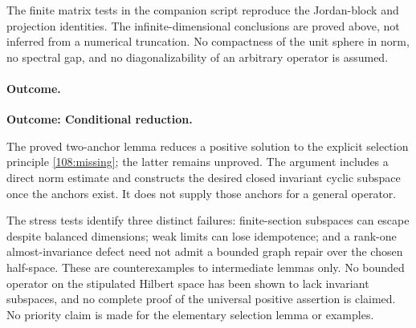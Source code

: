 \documentclass[11pt,a4paper]{article}
\numberwithin{equation}{section}
\begin{document}
The finite matrix tests in the companion script reproduce the Jordan-block
and projection identities. The infinite-dimensional conclusions are proved
above, not inferred from a numerical truncation. No compactness of the unit
sphere in norm, no spectral gap, and no diagonalizability of an arbitrary
operator is assumed.

\paragraph{Outcome.}
\textbf{Outcome: Conditional reduction.}

The proved two-anchor lemma reduces a positive solution to the explicit
selection principle \eqref{108:missing}; the latter remains unproved.
The argument includes a direct norm estimate and constructs the desired
closed invariant cyclic subspace once the anchors exist. It does not
supply those anchors for a general operator.

The stress tests identify three distinct failures: finite-section subspaces
can escape despite balanced dimensions; weak limits can lose idempotence;
and a rank-one almost-invariance defect need not admit a bounded graph
repair over the chosen half-space. These are counterexamples to intermediate
lemmas only. No bounded operator on the stipulated Hilbert space has been
shown to lack invariant subspaces, and no complete proof of the universal
positive assertion is claimed. No priority claim is made for the elementary
selection lemma or examples.

\par{}
\end{document}
